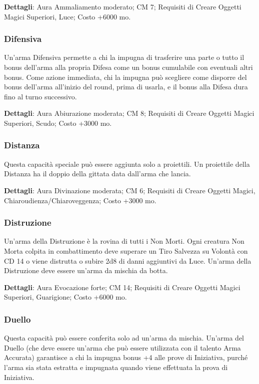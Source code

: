 \begin{multicols}{2}
\textbf{Dettagli}: Aura Ammaliamento moderato; CM 7; Requisiti di Creare Oggetti Magici Superiori, Luce; Costo +6000 mo.

\subsubsection{Difensiva}

Un'arma Difensiva permette a chi la impugna di trasferire una parte o tutto il bonus dell'arma alla propria Difesa come un bonus cumulabile con eventuali altri bonus. Come azione immediata, chi la impugna può scegliere come disporre del bonus dell'arma all'inizio del round, prima di usarla, e il bonus alla Difesa dura fino al turno successivo.

\textbf{Dettagli}: Aura Abiurazione moderata; CM 8; Requisiti di Creare Oggetti Magici Superiori, Scudo; Costo +3000 mo.

\subsubsection{Distanza}

Questa capacità speciale può essere aggiunta solo a proiettili. Un proiettile della Distanza ha il doppio della gittata data dall'arma che lancia.

\textbf{Dettagli}: Aura Divinazione moderata; CM 6; Requisiti di Creare Oggetti Magici, Chiaroudienza/Chiaroveggenza; Costo +3000 mo.


\subsubsection{Distruzione}

Un'arma della Distruzione è la rovina di tutti i Non Morti. Ogni creatura Non Morta colpita in combattimento deve superare un Tiro Salvezza su Volontà con CD 14 o viene distrutta o subire 2d8 di danni aggiuntivi da Luce. Un'arma della Distruzione deve essere un'arma da mischia da botta.

\textbf{Dettagli}: Aura Evocazione forte; CM 14; Requisiti di Creare Oggetti Magici Superiori, Guarigione; Costo +6000 mo.

\subsubsection{Duello}

Questa capacità può essere conferita solo ad un'arma da mischia. Un'arma del Duello (che deve essere un'arma che può essere utilizzata con il talento Arma Accurata) garantisce a chi la impugna bonus +4 alle prove di Iniziativa, purché l'arma sia stata estratta e impugnata quando viene effettuata la prova di Iniziativa. 


\end{multicols}
